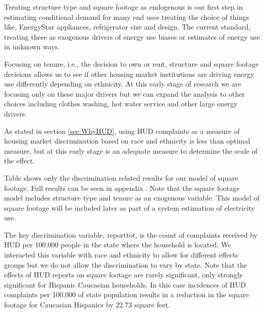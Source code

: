\documentclass{article}
\begin{document}
Treating structure type and square footage as endogenous is our first step in estimating conditional demand for many end uses treating the choice of things like, EnergyStar appliances, refrigerator size and design.  The current standard, treating these as exogenous drivers of energy use biases or estimates of energy use in unknown ways.

Focusing on tenure, i.e., the decision to own or rent, structure and square footage decisions allows us to see if other housing market institutions are driving energy use differently depending on ethnicity.  At this early stage of research we are focusing only on these major drivers but we can expand the analysis to other choices including clothes washing, hot water service and other large energy drivers.

As stated in section \ref{sec:WhyHUD}, using HUD complaints as a measure of housing market discrimination based on race and ethnicity is less than optimal measure, but at this early stage is an adequate measure to determine the scale of the effect.  


Table 
shows only the discrimination related results for our model of square footage.  Full results can be seen in appendix 
.   Note that the square footage model includes structure type and tenure as an exogenous variable.  This model of square footage will be included later as part of a system estimation of electricity use.   

The key discrimination variable, reporttot, is the count of complaints received by HUD per 100,000 people in the state where the household is located. We interacted this variable with race and ethnicity to allow for different effects  groups but we do not allow the discrimination to vary by state. Note that the effects of HUD reports on square footage are rarely significant, only strongly significant for Hispanic Caucasian households.  In this case incidences of HUD complaints per 100,000 of state population results in a reduction in the square footage for Caucasian Hispanics by 22.73 square feet.


\end{document}
